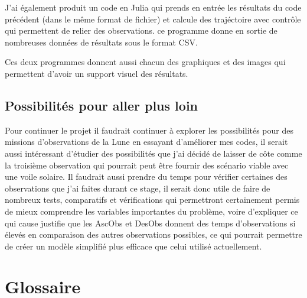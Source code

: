 \documentclass[11pt]{article} %
\begin{document}
		J'ai également produit un code en Julia qui prends en entrée les résultats du code précédent (dans le même format de fichier) et calcule des trajéctoire avec contrôle qui permettent de relier des observations. ce programme donne en sortie de nombreuses données de résultats sous le format CSV.
		
		Ces deux programmes donnent aussi chacun des graphiques et des images qui permettent d'avoir un support visuel des résultats.
		
		\subsection{Possibilités pour aller plus loin}
		Pour continuer le projet il faudrait continuer à explorer les possibilités pour des missions d'observations de la Lune en essayant d'améliorer mes codes, il serait aussi intéressant d'étudier des possibilités que j'ai décidé de laisser de côte comme la troisième observation qui pourrait peut être fournir des scénario viable avec une voile solaire. Il faudrait aussi prendre du temps pour vérifier certaines des observations que j'ai faites durant ce stage, il serait donc utile de faire de nombreux tests, comparatifs et vérifications qui permettront certainement permis de mieux comprendre les variables importantes du problème, voire d'expliquer ce qui cause justifie que les \gls{AscObs} et \gls{DesObs} donnent des temps d'observations si élevés en comparaison des autres observations possibles, ce qui pourrait permettre de créer un modèle simplifié plus efficace que celui utilisé actuellement.
		
		\vfill
		
		\section{Glossaire}
		
		\printglossaries
		
		
\end{document}
